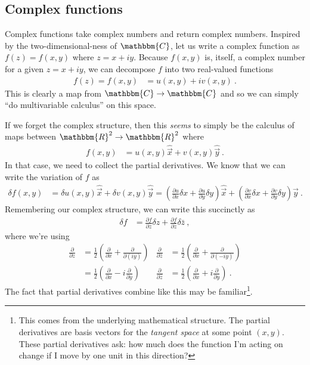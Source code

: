 \subsection{Complex functions}

Complex functions take complex numbers and return complex numbers. Inspired by the two-dimensional-ness of $\mathbbm{C}$, let us write a complex function as $f(z)=f(x,y)$ where $z = x+i y$. Because $f(x,y)$ is, itself, a complex number for a given $z=x+i y$, we can decompose $f$ into two real-valued functions
\begin{align}
	f(z) = f(x,y) &= u(x,y) + i v(x,y) \ .
\end{align}
This is clearly a map from $\mathbbm{C} \to \mathbbm{C}$ and so we can simply ``do multivariable calculus'' on this space. 

If we forget the complex structure, then this \emph{seems} to simply be the calculus of maps between $\mathbbm{R}^2 \to \mathbbm{R}^2$ where
\begin{align}
	f(x,y) &= u(x,y) \hat{\vec{x}} + v(x,y)\hat{\vec{y}} \ .
\end{align}
In that case, we need to collect the partial derivatives. We know that we can write the variation of $f$ as
\begin{align}
\delta f(x,y) &= \delta u(x,y) \hat{\vec{x}} + \delta v(x,y)\hat{\vec{y}} 
=
\left(
	\frac{\partial u}{\partial x}\delta x +
	\frac{\partial u}{\partial y}\delta y
\right)\hat{\vec{x}}+
\left(
	\frac{\partial v}{\partial x}\delta x +
	\frac{\partial v}{\partial y}\delta y
\right)\hat{\vec{y}} \ .
\end{align}
Remembering our complex structure, we can write this succinctly as
\begin{align}
	\delta f &= 
	\frac{\partial f}{\partial z}\delta z +
	\frac{\partial f}{\partial \bar z}\delta \bar z \ ,
	\label{eq:complex:2D:deviation}
\end{align}
where we're using
\begin{align}
	\frac{\partial}{\partial z} &= 
	\frac{1}{2}
	\left(
	\frac{\partial}{\partial x}
	+
	\frac{\partial}{\partial (iy)}
	\right)
	&
	\frac{\partial}{\partial \bar z} &= 
	\frac{1}{2}
	\left(
	\frac{\partial}{\partial x}
	+
	\frac{\partial}{\partial (-iy)}
	\right) 
	\\
	&=
	\frac{1}{2}
	\left(
	\frac{\partial}{\partial x}
	-i
	\frac{\partial}{\partial y}
	\right)
	&
	\frac{\partial}{\partial \bar z} &= 
	\frac{1}{2}
	\left(
	\frac{\partial}{\partial x}
	+i
	\frac{\partial}{\partial y}
	\right) 
	\ .
\end{align}
The fact that partial derivatives combine like this may be familiar\footnote{This comes from the underlying mathematical structure. The partial derivatives are basis vectors for the \emph{tangent space} at some point $(x,y)$. These partial derivatives ask: how much does the function I'm acting on change if I move by one unit in this direction?}. 

